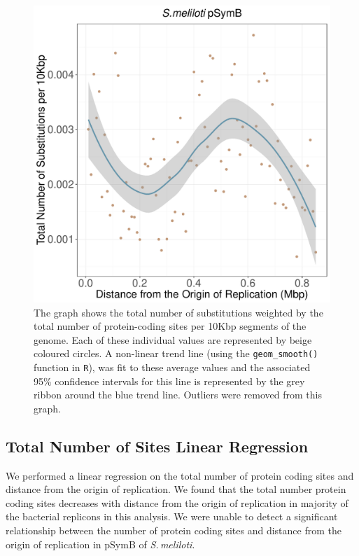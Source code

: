 \documentclass[11pt]{article}
\newcommand{\smel}{\textit{S.\,meliloti}\xspace}
\newcommand{\pb}{pSymB\xspace}
\begin{document}
\begin{figure}[h]
	\begin{center}
		\includegraphics[width=\textwidth]{./figs/pSymB_10KB_weighted_subs_nonpar_12Sep20.pdf}
		\caption{\label{fig:pSymB_nonpar}The graph shows the total number of substitutions weighted by the total number of protein-coding sites per 10Kbp segments of the genome. Each of these individual values are represented by beige coloured circles. A non-linear trend line (using the \texttt{geom\_smooth()} function in \texttt{R}), was fit to these average values and the associated 95\% confidence intervals for this line is represented by the grey ribbon around the blue trend line. Outliers were removed from this graph.}
	\end{center}
\end{figure}

\subsection{Total Number of Sites Linear Regression}

We performed a linear regression on the total number of protein coding sites and distance from the origin of replication.
We found that the total number protein coding sites decreases with distance from the origin of replication in majority of the bacterial replicons in this analysis.
We were unable to detect a significant relationship between the number of protein coding sites and distance from the origin of replication in \pb of \smel.
\end{document}
